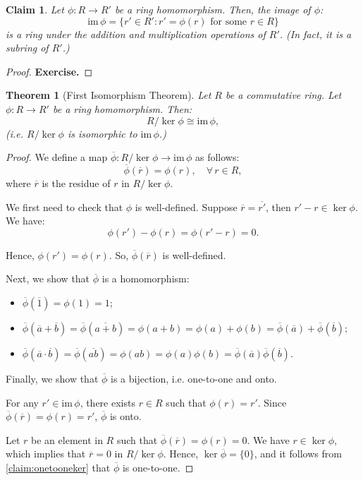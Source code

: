 \documentclass[a4paper,12pt]{report}
\newcommand{\ol}[1]{\overline{#1}}
\newcommand{\im}{\mathrm{im}\,}
\newcommand{\ra}{\longrightarrow}
\newcommand{\phib}{\ol{\phi}}
\newcounter{statement}
\numberwithin{statement}{chapter}
\newtheorem{thm}[statement]{Theorem}
\newtheorem{claim}[statement]{Claim}
\numberwithin{equation}{chapter}
\numberwithin{section}{chapter}
\numberwithin{subsection}{section}
\begin{document}
\begin{claim}
Let $\phi : R \longrightarrow R'$ be a ring homomorphism.  Then, the image of $\phi$:
\[
\im \phi = \{r' \in R' : r' = \phi(r) \text{ for some } r \in R\}
\]
is a ring under the addition and multiplication operations of $R'$.
(In fact, it is a subring of $R'$.)
\end{claim}
\begin{proof}
 {\bf Exercise.} 
\end{proof}




\begin{thm}[First Isomorphism Theorem]


Let $R$ be a commutative ring.
Let $\phi : R \ra R'$ be a ring homomorphism.
Then:
\[
R/\ker\phi \cong \im \phi,
\]
(i.e. $R/\ker \phi$ is isomorphic to $\im \phi$.)
\end{thm}
\begin{proof}

We define a map $\ol{\phi} : R/\ker\phi \ra \im \phi$ as follows:
\[
\ol{\phi}(\ol{r}) = \phi(r), \quad \forall\, r \in R,
\]
where $\ol{r}$ is the residue of $r$ in $R/\ker \phi$.





We first need to check that $\phi$ is well-defined.
Suppose $\ol{r} = \ol{r'}$, then $r' - r \in \ker\phi$.
We have:
\[
\phi(r') - \phi(r) = \phi(r' - r) = 0.
\]

Hence, $\phi(r') = \phi(r)$.
So, $\phib(\ol{r})$ is well-defined.




Next, we show that $\phib$ is a homomorphism:
\begin{itemize}
\item 
$\phib(\ol{1}) = \phi(1) = 1$;

\item 
$
\phib(\ol{a} + \ol{b}) = \phib(\ol{a + b}) = \phi(a + b) = \phi(a) + \phi(b)
= \phib(\ol{a}) + \phib(\ol{b});
$

\item 
$
\phib(\ol{a} \cdot \ol{b})
= \phib(\ol{ab}) = \phi(ab) = \phi(a)\phi(b) = \phib(\ol{a})\phib(\ol{b}).
$
\end{itemize}





Finally, we show that $\phib$ is a bijection, i.e. one-to-one and onto.





For any $r' \in\im \phi$, there exists $r \in R$ such that $\phi(r) = r'$.
Since $\phib(\ol{r}) = \phi(r) = r'$, $\phib$ is onto.





Let $r$ be an element in $R$ such that
$\phib(\ol{r}) = \phi(r) = 0$.
We have $r \in \ker \phi$, which implies that $\ol{r} = 0$ in $R/\ker\phi$.
Hence, $\ker \phib = \{0\}$, and it follows from \cref{claim:onetooneker} that $\phib$ is one-to-one.


\end{proof}
\end{document}
